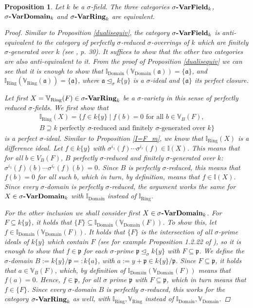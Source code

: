 \documentclass{article}
\def\I{\mathbb{I}}
\def\VV{\mathbb{V}}
\def\a{\mathfrak{a}}
\def\p{\mathfrak{p}}
\def\s{\sigma}
\def\si{\unlhd_{\sigma}}
\def\fa{\text{ for all }}
\newcommand{\catname}[1]{{\normalfont\textbf{#1}}}
\newenvironment{bew}{\begin{proof}[Proof]}{\end{proof}}
\theoremstyle{plain}
\newtheorem{prop}[Satz]{Proposition}
\theoremstyle{definition}
\begin{document}
\begin{prop}
Let $k$ be a $\s$-field. The three categories $\s\text{\catname{-VarField}}_k$, $\s\text{\catname{-VarDomain}}_k$ and $\s\text{\catname{-VarRing}}_k$ are equivalent.

\begin{bew}
Similar to Proposition \ref{dualisequiv}, the category $\s\text{\catname{-VarField}}_k$ is anti-equivalent to the category of perfectly $\s$-reduced $\s$-overrings of $k$ which are finitely $\s$-generated over $k$ (see \cite{wibmer}, p. 30).
It suffices to show that the other two categories are also anti-equivalent to it. From the proof of Proposition \ref{dualisequiv} we can see that it is enough to show that $\I_{\text{Domain}}(\VV_{\text{Domain}}(\a)) = \{\a\}$, and $\I_{\text{Ring}}(\VV_{\text{Ring}}(\a)) = \{\a\}$,
 where $\a \si k\{y\}$ is a $\s$-ideal and $\{ \a \}$ its perfect closure. 

Let first $X  = \VV_{\text{Ring}}(F) \in \s\text{\catname{-VarRing}}_k$ be a $\s$-variety in this sense of perfectly reduced $\s$-fields. 
We first show that \begin{align*} \I_{\text{Ring}}(X) =  \{ f \in k\{y\} \mid f(b) = 0 \fa b \in \VV_B(F), \\ B \supseteq k\text{ perfectly }\s\text{-reduced and finitely }\s\text{-generated over }k \} \end{align*}
 is a perfect $\s$-ideal. Similar to Proposition \ref{I=F_m}, we know that $\I_{\text{Ring}}(X)$ is a difference ideal. Let $f \in k\{y\}$ with $\s^{i_1}(f) \cdots \s^{i_r}(f) \in \I(X)$. This means that for all $b \in V_B(F)$,
 $B$ perfectly $\s$-reduced and finitely $\s$-generated over $k$: $\s^{i_1}(f)(b) \cdots \s^{i_r}(f)(b) = 0$. Since $B$ is perfectly $\s$-reduced, this means that $f(b) = 0$ for all such $b$,
 which in turn, by definition, means that $f \in \I(X)$. Since every $\s$-domain is perfectly $\s$-reduced, the argument works the same for $X \in \s\text{\catname{-VarDomain}}_k$ with $\I_{\text{Domain}}$ instead of $\I_{\text{Ring}}$.

For the other inclusion we shall consider first $X \in \s\text{\catname{-VarDomain}}_k$.
For $F \subseteq k\{y\}$, it holds that $\{F\} \subseteq \I_{\text{Domain}}(\VV_{\text{Domain}}(F))$. To show this, let $f \in \I_{\text{Domain}}(\VV_{\text{Domain}}(F))$.
It holds that $\{F\}$ is the intersection of all $\s$-prime ideals of $k\{y\}$ which contain $F$ (see for example Proposition 1.2.22 of \cite{wibmer}), so it is enough to show that $f \in \p$ for each $\s$-prime $\p \si k\{y\}$ with $F \subseteq \p$.
We define the $\s$-domain $B:= k\{y\}/\p =: k\{a\}$, with $a := y + \p \in k\{y\}/\p$. Since $F \subseteq \p$, it holds that $a \in \VV_B(F)$, which, by definition of $\I_{\text{Domain}}(\VV_{\text{Domain}}(F))$ means that $f(a) = 0$. Hence, $f \in \p$, for all $\s$ prime $\p$
with $F \subseteq \p$, which in turn means that $f \in \{F\}$. Since every $\s$-domain $B$ is perfectly $\s$-reduced, this works for the category $\s\text{\catname{-VarRing}}_k$ as well, with $\I_{\text{Ring}}, \VV_{\text{Ring}}$ instead of $\I_{\text{Domain}}, \VV_{\text{Domain}}$.
\end{bew}

\end{prop}
\end{document}
